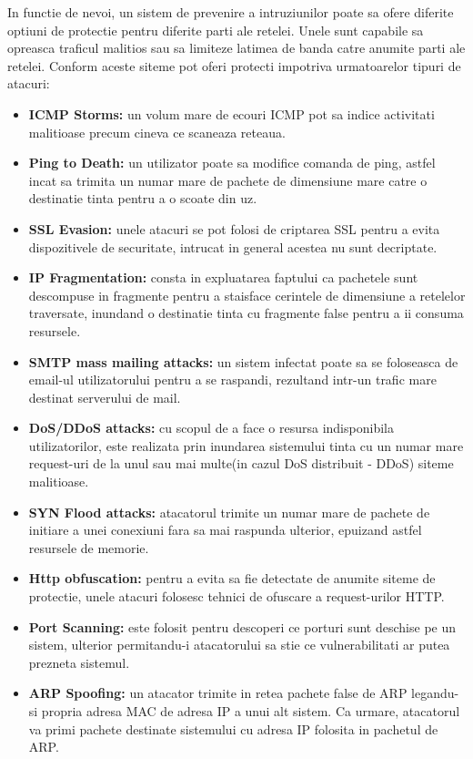 In functie de nevoi, un sistem de prevenire a intruziunilor poate sa ofere diferite optiuni de protectie pentru diferite parti ale retelei. Unele sunt capabile sa opreasca traficul malitios sau sa limiteze latimea de banda catre anumite parti ale retelei. Conform \cite{ips_sec_types} aceste siteme pot oferi protecti impotriva urmatoarelor tipuri de atacuri:
\begin{itemize}
	\item \textbf{ICMP Storms:} un volum mare de ecouri ICMP pot sa indice activitati malitioase precum cineva ce scaneaza reteaua.
	\item \textbf{Ping to Death:} un utilizator poate sa modifice comanda de ping, astfel incat sa trimita un numar mare de pachete de dimensiune mare catre o destinatie tinta pentru a o scoate din uz.
	\item \textbf{SSL Evasion:} unele atacuri se pot folosi de criptarea SSL pentru a evita dispozitivele de securitate, intrucat in general acestea nu sunt decriptate.
	\item \textbf{IP Fragmentation:} consta in expluatarea faptului ca pachetele sunt descompuse in fragmente pentru a staisface cerintele de dimensiune a retelelor traversate, inundand o destinatie tinta cu fragmente false pentru a ii consuma resursele. 
	\item \textbf{SMTP mass mailing attacks:} un sistem infectat poate sa se foloseasca de email-ul utilizatorului pentru a se raspandi, rezultand intr-un trafic mare destinat serverului de mail.
	\item \textbf{DoS/DDoS attacks:} cu scopul de a face o resursa indisponibila utilizatorilor, este realizata prin inundarea sistemului tinta cu un numar mare request-uri de la unul sau mai multe(in cazul DoS distribuit - DDoS) siteme malitioase.
	\item \textbf{SYN Flood attacks:} atacatorul trimite un numar mare de pachete de initiare a unei conexiuni fara sa mai raspunda ulterior, epuizand astfel resursele de memorie.
	\item \textbf{Http obfuscation:} pentru a evita sa fie detectate de anumite siteme de protectie, unele atacuri folosesc tehnici de ofuscare a request-urilor HTTP.
	\item \textbf{Port Scanning:} este folosit pentru descoperi ce porturi sunt deschise pe un sistem, ulterior permitandu-i atacatorului sa stie ce vulnerabilitati ar putea prezneta sistemul.
	\item \textbf{ARP Spoofing:} un atacator trimite in retea pachete false de ARP legandu-si propria adresa MAC de adresa IP a unui alt sistem. Ca urmare, atacatorul va primi pachete destinate sistemului cu adresa IP folosita in pachetul de ARP.

\end{itemize}
